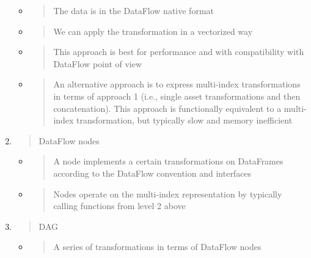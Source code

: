\documentclass[11pt, reqno]{amsart}
\begin{document}
\begin{enumerate}
  \begin{itemize}
  \item
    \begin{quote}
    The data is in the DataFlow native format
    \end{quote}
  \item
    \begin{quote}
    We can apply the transformation in a vectorized way
    \end{quote}
  \item
    \begin{quote}
    This approach is best for performance and with compatibility with
    DataFlow point of view
    \end{quote}
  \item
    \begin{quote}
    An alternative approach is to express multi-index transformations in
    terms of approach 1 (i.e., single asset transformations and then
    concatenation). This approach is functionally equivalent to a
    multi-index transformation, but typically slow and memory
    inefficient
    \end{quote}
  \end{itemize}
\item
  \begin{quote}
  DataFlow nodes
  \end{quote}

  \begin{itemize}
  \item
    \begin{quote}
    A node implements a certain transformations on DataFrames according
    to the DataFlow convention and interfaces
    \end{quote}
  \item
    \begin{quote}
    Nodes operate on the multi-index representation by typically calling
    functions from level 2 above
    \end{quote}
  \end{itemize}
\item
  \begin{quote}
  DAG
  \end{quote}

  \begin{itemize}
  \item
    \begin{quote}
    A series of transformations in terms of DataFlow nodes
    \end{quote}
  \end{itemize}
\end{enumerate}
\end{document}
